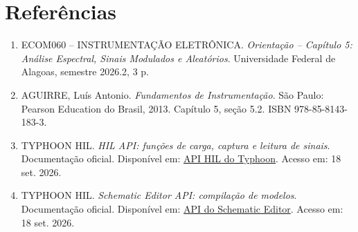 \documentclass[11pt,a4paper]{article}
\begin{document}
\section*{Referências}
\begin{enumerate}[leftmargin=2.0em]
\item ECOM060 -- INSTRUMENTAÇÃO ELETRÔNICA. \emph{Orientação -- Capítulo 5: Análise Espectral, Sinais Modulados e Aleatórios}. Universidade Federal de Alagoas, semestre 2026.2, 3 p.
\item AGUIRRE, Luís Antonio. \emph{Fundamentos de Instrumentação}. São Paulo: Pearson Education do Brasil, 2013. Capítulo 5, seção 5.2. ISBN 978-85-8143-183-3.
\item TYPHOON HIL. \emph{HIL API: funções de carga, captura e leitura de sinais}. Documentação oficial. Disponível em: \href{https://www.typhoon-hil.com/documentation/typhoon-hil-api-documentation/hil_api.html}{API HIL do Typhoon}. Acesso em: 18 set. 2026.
\item TYPHOON HIL. \emph{Schematic Editor API: compilação de modelos}. Documentação oficial. Disponível em: \href{https://www.typhoon-hil.com/documentation/typhoon-hil-api-documentation/schematic_api.html}{API do Schematic Editor}. Acesso em: 18 set. 2026.
\end{enumerate}
\end{document}
